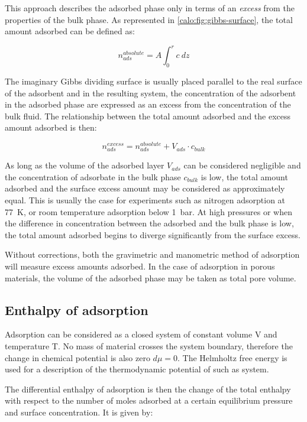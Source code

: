 This approach describes the adsorbed phase only in terms
of an \textit{excess} from the properties of the bulk phase.
As represented in \autoref{calo:fig:gibbs-surface}, the total
amount adsorbed can be defined as:

\begin{equation}
  n_{ads}^{absolute} = A \int_0^r c\ dz
\end{equation}

The imaginary Gibbs dividing surface is usually placed parallel to
the real surface of the adsorbent and in the resulting system, the
concentration of the adsorbent in the adsorbed phase are 
expressed as an excess from the concentration of the bulk fluid.
The relationship between the total amount adsorbed and the 
excess amount adsorbed is then:

\begin{equation}
  n_{ads}^{excess} = n_{ads}^{absolute} + V_{ads} \cdot c_{bulk}
\end{equation}

As long as the volume of the adsorbed layer \(V_{ads}\) can be 
considered negligible and the concentration of adsorbate in the bulk 
phase \(c_{bulk}\) is low, the total amount adsorbed and the surface 
excess amount may be considered as approximately equal.
This is usually the case for experiments such as nitrogen 
adsorption at \SI{77}{\kelvin}, or room temperature adsorption
below \SI{1}{\bar}.
At high pressures or when the difference in concentration between
the adsorbed and the bulk phase is low, the total amount adsorbed
begins to diverge significantly from the surface excess. 

Without corrections, both the gravimetric and manometric
method of adsorption will measure excess amounts adsorbed.
In the case of adsorption in porous materials, the volume of the
adsorbed phase may be taken as total pore volume. 

\subsection{Enthalpy of adsorption}

Adsorption can be considered as a closed system of constant volume
V and temperature T. No mass of material crosses the system boundary,
therefore the change in chemical potential is also
zero \(d\mu = 0\). The Helmholtz free energy is used for a description 
of the thermodynamic potential of such as system. 

The differential enthalpy of adsorption is then the change of the 
total enthalpy with respect to the number of moles adsorbed
at a certain equilibrium pressure and surface concentration.
It is given by:

